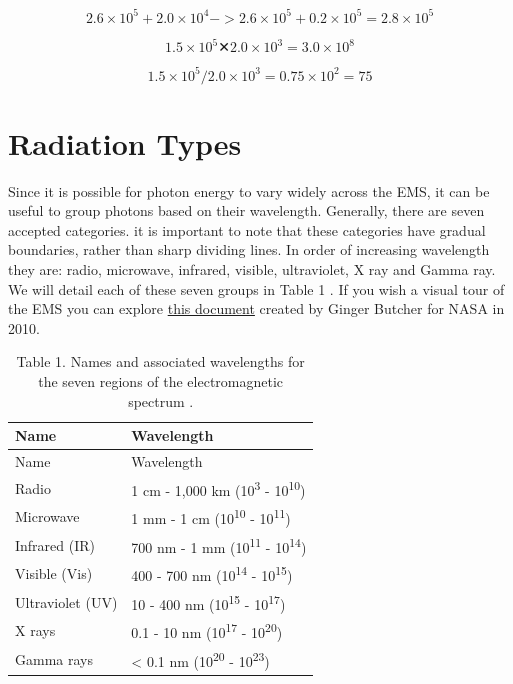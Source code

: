 \documentclass[
]{book}
\begin{document}
\begin{equation}
2.6 × 10 ^{5} + 2.0 × 10 ^{4}   ->
2.6 × 10 ^{5} + 0.2 × 10 ^{5} = 2.8 × 10 ^{5} 
\label{eq:SI-add}
\end{equation}

\begin{equation}
1.5 × 10 ^{5} ✕ 2.0 × 10 ^{3} = 3.0 × 10 ^{8} 
\label{eq:SI-multiply}
\end{equation}

\begin{equation}
1.5 × 10 ^{5} / 2.0 × 10 ^{3} = 0.75 × 10 ^{2} = 75
\label{eq:SI-divide}
\end{equation}

\hypertarget{radiation-types}{%
\section{Radiation Types}\label{radiation-types}}

Since it is possible for photon energy to vary widely across the
EMS, it can be useful to group photons based on their wavelength.
Generally, there are seven accepted categories. it is important to note
that these categories have gradual boundaries, rather than sharp
dividing lines. In order of increasing wavelength they are: radio,
microwave, infrared, visible, ultraviolet, X ray and Gamma ray. We will
detail each of these seven groups in Table 1 \citep{zwinkels_encyclopedia_2020}. If you
wish a visual tour of the EMS you can explore \href{https://books.google.ca/books?id=DfLPpxogdM4C\&pg=PP1\#v=onepage\&q\&f=false}{this
document}
created by Ginger Butcher for NASA in 2010.

\begin{longtable}[]{@{}ll@{}}
\caption{Table 1. Names and associated wavelengths for the seven regions of the
electromagnetic spectrum \citep{zwinkels_encyclopedia_2020}.}\tabularnewline
\toprule
Name & Wavelength \\
\midrule
\endfirsthead
\toprule
Name & Wavelength \\
\midrule
\endhead
Radio & 1 cm - 1,000 km (10\textsuperscript{3} - 10\textsuperscript{10}) \\
Microwave & 1 mm - 1 cm (10\textsuperscript{10} - 10\textsuperscript{11}) \\
Infrared (IR) & 700 nm - 1 mm (10\textsuperscript{11} - 10\textsuperscript{14}) \\
Visible (Vis) & 400 - 700 nm (10\textsuperscript{14} - 10\textsuperscript{15}) \\
Ultraviolet (UV) & 10 - 400 nm (10\textsuperscript{15} - 10\textsuperscript{17}) \\
X rays & 0.1 - 10 nm (10\textsuperscript{17} - 10\textsuperscript{20}) \\
Gamma rays & \textless{} 0.1 nm (10\textsuperscript{20} - 10\textsuperscript{23}) \\
\bottomrule
\end{longtable}
\end{document}
